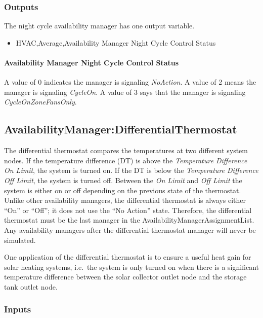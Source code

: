 \subsubsection{Outputs}\label{outputs-2-022}

The night cycle availability manager has one output variable.

\begin{itemize}
\tightlist
\item
  HVAC,Average,Availability Manager Night Cycle Control Status
\end{itemize}

\paragraph{Availability Manager Night Cycle Control Status}\label{availability-manager-night-cycle-control-status}

A value of 0 indicates the manager is signaling \emph{NoAction}. A value of 2 means the manager is signaling \emph{CycleOn}. A value of 3 says that the manager is signaling \emph{CycleOnZoneFansOnly}.

\subsection{AvailabilityManager:DifferentialThermostat}\label{availabilitymanagerdifferentialthermostat}

The differential thermostat compares the temperatures at two different system nodes. If the temperature difference (DT) is above the \emph{Temperature Difference On Limit}, the system is turned on. If the DT is below the \emph{Temperature Difference Off Limit}, the system is turned off. Between the \emph{On Limit} and \emph{Off Limit} the system is either on or off depending on the previous state of the thermostat. Unlike other availability managers, the differential thermostat is always either ``On'' or ``Off''; it does not use the ``No Action'' state. Therefore, the differential thermostat must be the last manager in the AvailabilityManagerAssignmentList. Any availability managers after the differential thermostat manager will never be simulated.

One application of the differential thermostat is to ensure a useful heat gain for solar heating systems, i.e.~the system is only turned on when there is a significant temperature difference between the solar collector outlet node and the storage tank outlet node.

\subsubsection{Inputs}\label{inputs-4-034}

